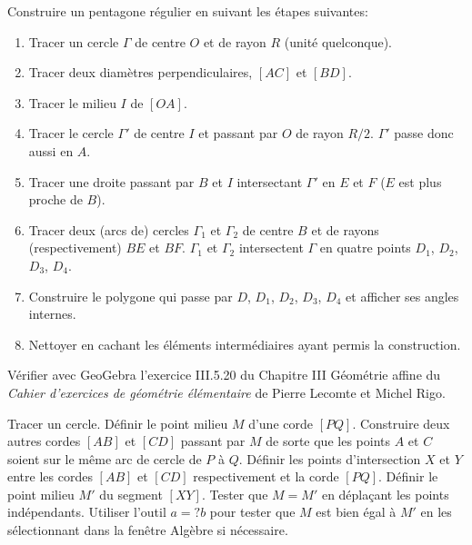 \begin{exercice}
Construire un pentagone régulier en suivant les étapes
suivantes:
\begin{enumerate}
\item    Tracer un cercle $\Gamma$ de centre $O$ et de rayon $R$ (unité quelconque).
\item    Tracer deux diamètres perpendiculaires, $[AC]$ et $[BD]$.
\item    Tracer le milieu $I$ de $[OA]$.
\item    Tracer le cercle $\Gamma'$ de centre $I$ et passant par $O$ de rayon $R/2$. $\Gamma'$ passe donc aussi en $A$.
\item    Tracer une droite passant par $B$ et $I$ intersectant $\Gamma'$ en $E$ et $F$ ($E$ est plus proche de $B$).
\item    Tracer deux (arcs de) cercles $\Gamma_1$ et $\Gamma_2$ de centre $B$ et de rayons
(respectivement) $BE$ et $BF$.  $\Gamma_1$ et $\Gamma_2$ intersectent $\Gamma$
en quatre points $D_1$, $D_2$, $D_3$, $D_4$.
\item Construire le polygone qui passe par $D$, $D_1$, $D_2$, $D_3$,
$D_4$ et afficher ses angles internes.
\item Nettoyer en cachant les éléments intermédiaires ayant permis la
construction.
\end{enumerate}
\end{exercice}

\begin{exercice}
Vérifier avec GeoGebra l'exercice III.5.20 du Chapitre III Géométrie affine du
\emph{Cahier d'exercices de géométrie élémentaire} de Pierre Lecomte et Michel
Rigo.
\end{exercice}


\begin{exercice}[Théorème du papillon]
Tracer un cercle. Définir le point milieu $M$ d'une corde $[PQ]$. Construire deux
autres cordes $[AB]$ et $[CD]$ passant par $M$ de sorte que les points $A$ et
$C$ soient sur le même arc de cercle de $P$ à $Q$. Définir les points
d'intersection $X$ et $Y$ entre les cordes 
$[AB]$ et $[CD]$ respectivement et la corde $[PQ]$.
Définir le point milieu $M'$ du segment $[XY]$.
Tester que $M=M'$ en déplaçant les points indépendants.
Utiliser l'outil $a=?b$ pour tester que $M$ est bien égal à $M'$ en les
sélectionnant dans la fenêtre Algèbre si nécessaire.
\end{exercice}

